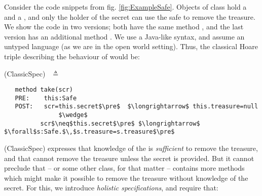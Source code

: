 Consider the code snippets from fig. \ref{fig:ExampleSafe}. Objects of
 class   hold a  and a , and  only the holder of the secret can use the safe to
 remove the treasure.
%
 We show the code in two versions; both   have the same method , and the last version 
 has an additional method .
  We use a Java-like syntax, and assume an untyped language (as we are in the open world setting).
 Thus, the classical Hoare triple describing the behaviour of  would be:
 
  \vspace{.1in}
  
(ClassicSpec)$  \ \ $  $\triangleq$
\vspace{-.1in}
\begin{lstlisting}
   method take(scr)
   PRE:    this:Safe  
   POST:   scr=this.secret$\pre$  $\longrightarrow$ this.treasure=null 
               $\wedge$
          scr$\neq$this.secret$\pre$ $\longrightarrow$  $\forall$s:Safe.$\,$s.treasure=s.treasure$\pre$
 \end{lstlisting}
\vspace{-.2in}

(ClassicSpec)  expresses  that knowledge of the  is  \emph{sufficient} %
to remove the treasure, and that  %
%
  cannot remove the treasure unless the secret is
provided. 
%
But it cannot preclude that  -- or some other class, for that matter -- contains more methods 
which might make it possible to remove the treasure  without knowledge of the
secret. For this, we introduce \emph{holistic specifications}, and require that:
 

